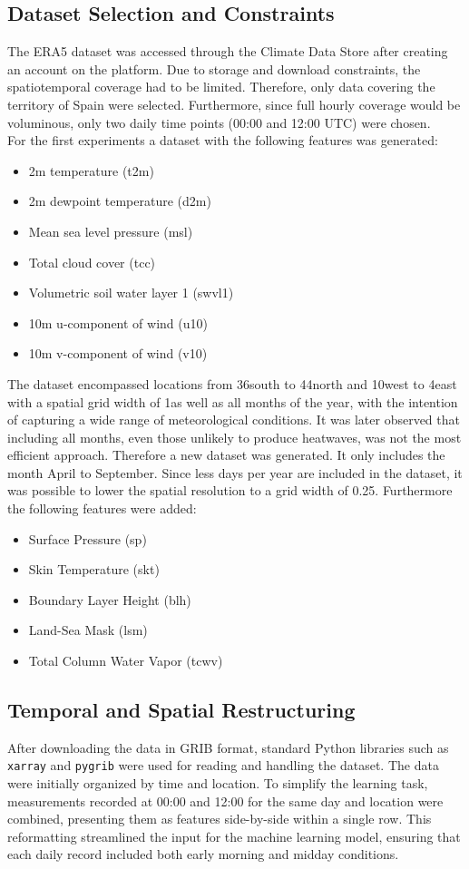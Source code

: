 \documentclass[8pt,a4paper]{article}
\begin{document}
\subsection{Dataset Selection and Constraints}
\label{sec:DS}
The ERA5 dataset was accessed through the Climate Data Store after creating an account on the platform. Due to storage and download constraints, the spatiotemporal coverage had to be limited. Therefore, only data covering the territory of Spain were selected. Furthermore, since full hourly coverage would be voluminous, only two daily time points (00:00 and 12:00 UTC) were chosen.\\
For the first experiments a dataset with the following features was generated:
\begin{itemize}
    \item 2m temperature (t2m)
    \item 2m dewpoint temperature (d2m)
    \item Mean sea level pressure (msl)
    \item Total cloud cover (tcc)
    \item Volumetric soil water layer 1 (swvl1)
    \item 10m u-component of wind (u10)
    \item 10m v-component of wind (v10)
\end{itemize}
The dataset encompassed locations from 36\degree south to 44\degree north and 10\degree west to 4\degree east with a spatial grid width of 1\degree as well as all months of the year, with the intention of capturing a wide range of meteorological conditions. It was later observed that including all months, even those unlikely to produce heatwaves, was not the most efficient approach. Therefore a new dataset was generated. It only includes the month April to September. Since less days per year are included in the dataset, it was possible to lower the spatial resolution to a grid width of 0.25\degree. Furthermore the following features were added:
\begin{itemize}
    \item Surface Pressure (sp)
    \item Skin Temperature (skt)
    \item Boundary Layer Height (blh)
    \item Land-Sea Mask (lsm)
    \item Total Column Water Vapor (tcwv)
\end{itemize}

\subsection{Temporal and Spatial Restructuring}
After downloading the data in GRIB format, standard Python libraries such as \texttt{xarray} and \texttt{pygrib} were used for reading and handling the dataset. The data were initially organized by time and location. To simplify the learning task, measurements recorded at 00:00 and 12:00 for the same day and location were combined, presenting them as features side-by-side within a single row. This reformatting streamlined the input for the machine learning model, ensuring that each daily record included both early morning and midday conditions.
\end{document}
